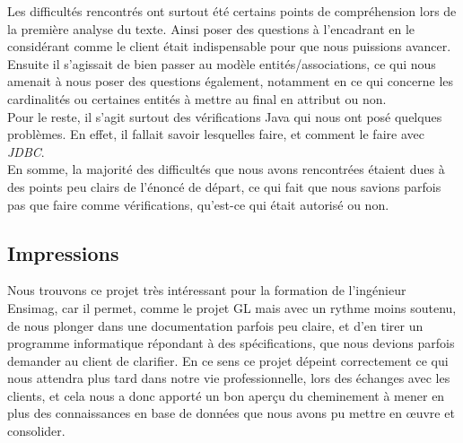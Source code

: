 \documentclass[10pt]{article}
\begin{document}
Les difficultés rencontrés ont surtout été certains points de compréhension lors de la première analyse du texte. Ainsi poser des questions
à l'encadrant en le considérant comme le client était indispensable pour que nous puissions avancer. \\

Ensuite il s'agissait de bien passer au modèle entités/associations, ce qui nous amenait à nous poser des questions également, notamment
en ce qui concerne les cardinalités ou certaines entités à mettre au final en attribut ou non. \\

Pour le reste, il s'agit surtout des vérifications Java qui nous ont posé quelques problèmes. En effet, il fallait savoir lesquelles
faire, et comment le faire avec \emph{JDBC}. \\

En somme, la majorité des difficultés que nous avons rencontrées étaient dues à des points peu clairs de l'énoncé de départ, ce qui fait
que nous savions parfois pas que faire comme vérifications, qu'est-ce qui était autorisé ou non.

\subsection{Impressions}

Nous trouvons ce projet très intéressant pour la formation de l'ingénieur Ensimag, car il permet, comme le projet GL mais avec un
rythme moins soutenu, de nous plonger dans une documentation parfois peu claire, et d'en tirer un programme informatique répondant
à des spécifications, que nous devions parfois demander au client de clarifier. En ce sens ce projet dépeint correctement ce qui nous
attendra plus tard dans notre vie professionnelle, lors des échanges avec les clients, et cela nous a donc apporté un bon aperçu
du cheminement à mener en plus des connaissances en base de données que nous avons pu mettre en \oe{}uvre et consolider.
\end{document}
